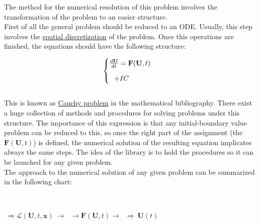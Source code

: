 The method for the numerical resolution of this problem involves the
transformation of the problem to an easier structure. \\

First of all the general problem should be reduced to an ODE. Usually, this step
involves the \underline{spatial discretization} of the problem. Once this
operations are finished, the equations should have the following structure: 


	$$\begin{cases} \frac{d \mathbf{U}}{dt}=  \mathbf F( \mathbf U, t)  \\[0.25cm]
	\hspace {0.25cm}+ IC 
	\end{cases}$$
	\\
	
This is known as \underline{Cauchy problem} in the mathematical bibliography.
There exist a huge collection of methods and procedures for solving problems
under this structure. The importance of this expression is that any
initial-boundary value problem can be reduced to this, so once the right part of
the assignment (the $\mathbf F( \mathbf U, t)$) is defined, the numerical
solution of the resulting equation implicates always the same steps. The idea of
the library is to hold the procedures so it can be launched for any given
problem.\\

The approach to the numerical solution of any given problem can be summarized in
the following chart: \\

\begin{framed}

% 
	\hfill
	 \\
	
{\begin{small}	
	
%
$\: \Rightarrow  {\mathscr{L}}( \mathbf U,
	t, \mathbf x)\: \rightarrow$
%
$ \: \rightarrow \mathbf F( \mathbf U, t)\rightarrow$
$\: \Longrightarrow \: \mathbf{U}(t)$

\end{small}}

\end{framed}

